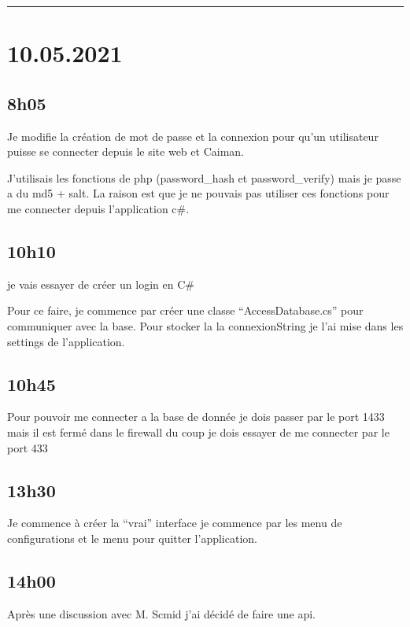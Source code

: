 \documentclass[a4paper,12pt,french]{sphinxmanual}
\begin{document}
\bigskip\hrule\bigskip



\section{10.05.2021}
\label{\detokenize{logbook:id89}}

\subsection{8h05}
\label{\detokenize{logbook:id90}}
\sphinxAtStartPar
Je modifie la création de mot de passe et la connexion pour qu’un utilisateur puisse se connecter depuis le site web et Caiman.

\sphinxAtStartPar
J’utilisais les fonctions de php (password\_hash et password\_verify) mais je passe a du md5 + salt. La raison est que je ne pouvais pas utiliser ces fonctions pour me connecter depuis l’application c\#.


\subsection{10h10}
\label{\detokenize{logbook:id91}}
\sphinxAtStartPar
je vais essayer de créer un login en C\#

\sphinxAtStartPar
Pour ce faire, je commence par créer une classe “AccessDatabase.cs” pour communiquer avec la base. Pour stocker la la connexionString je l’ai mise dans les settings de l’application.


\subsection{10h45}
\label{\detokenize{logbook:id92}}
\sphinxAtStartPar
Pour pouvoir me connecter a la base de donnée je dois passer par le port 1433 mais il est fermé dans le firewall du coup je dois essayer de me connecter par le port 433


\subsection{13h30}
\label{\detokenize{logbook:id93}}
\sphinxAtStartPar
Je commence à créer la “vrai” interface je commence par les menu de configurations et le menu pour quitter l’application.


\subsection{14h00}
\label{\detokenize{logbook:id94}}
\sphinxAtStartPar
Après une discussion avec M. Scmid j’ai décidé de faire une api.
\end{document}
